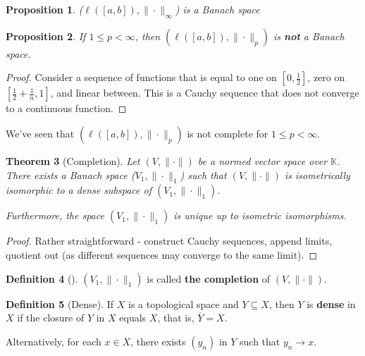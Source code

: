 \documentclass[10pt, oneside, reqno]{amsbook}
\theoremstyle{plain}%
\newtheorem{thm}{Theorem}[section]
\newtheorem{prop}[thm]{Proposition}
\theoremstyle{definition}
\newtheorem{defn}[thm]{Definition}
\theoremstyle{remark}
\newcommand{\K}{\mathbb{K}}
\begin{document}
\begin{prop}
    ($\ell([a,b]), \|\cdot \|_\infty$) is a Banach space
\end{prop}

\begin{prop}
    If $1 \leq p < \infty$, then $(\ell([a,b]), \| \cdot \|_p)$ is \textbf{not} a Banach space.
\end{prop}
\begin{proof}
    Consider a sequence of functions that is equal to one on $[0, \frac{1}{2}]$, zero on $[\frac{1}{2}+ \frac{1}{n}, 1]$, and linear between.  This is a Cauchy sequence that does not converge to a continuous function. 
\end{proof}

We've seen that $(\ell([a,b]), \| \cdot \|_p)$ is not complete for $1 \leq p < \infty$.  

\begin{thm}[Completion] Let $(V, \| \cdot \| )$ be a normed vector space over $\K$.  There exists a Banach space ($V_1, \| \cdot \|_1$) such that $( V, \| \cdot \|)$ is isometrically isomorphic to a dense subspace of $(V_1, \| \cdot \|_1)$.  
    
    Furthermore, the space $( V_1, \| \cdot \|_1)$ is unique up to isometric isomorphisms.  
\end{thm}

\begin{proof}
    Rather straightforward - construct Cauchy sequences, append limits, quotient out (as different sequences may converge to the same limit).
\end{proof}

\begin{defn}[] $(V_1, \| \cdot \|_1)$ is called \textbf{the completion} of $(V, \| \cdot \|)$. 
\end{defn}

\begin{defn}[Dense]
    If $X$ is a topological space and $Y \subseteq X$, then $Y$ is \textbf{dense} in $X$ if the closure of $Y$ in $X$ equals $X$, that is, $\overline{Y} = X$.

Alternatively, for each $x \in X$, there exists $(y_n)$ in $Y$ such that $y_n \rightarrow x$.
\end{defn}
\end{document}
